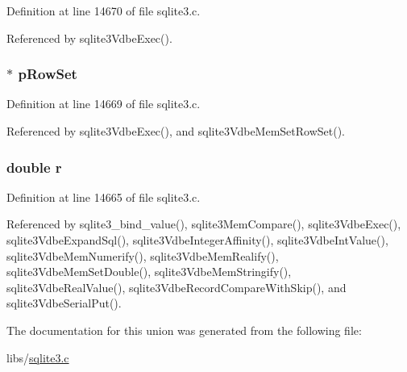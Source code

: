 Definition at line 14670 of file sqlite3.\+c.



Referenced by sqlite3\+Vdbe\+Exec().

\hypertarget{union_mem_1_1_mem_value_abca52c9345f143f58a581345e0afd619}{}
\subsubsection[{p\+Row\+Set}]{$\ast$ p\+Row\+Set}\label{union_mem_1_1_mem_value_abca52c9345f143f58a581345e0afd619}


Definition at line 14669 of file sqlite3.\+c.



Referenced by sqlite3\+Vdbe\+Exec(), and sqlite3\+Vdbe\+Mem\+Set\+Row\+Set().

\hypertarget{union_mem_1_1_mem_value_a880a49112fedae68e714341a9a082fb6}{}
\subsubsection[{r}]{\setlength{\rightskip}{0pt plus 5cm}double r}\label{union_mem_1_1_mem_value_a880a49112fedae68e714341a9a082fb6}


Definition at line 14665 of file sqlite3.\+c.



Referenced by sqlite3\+\_\+bind\+\_\+value(), sqlite3\+Mem\+Compare(), sqlite3\+Vdbe\+Exec(), sqlite3\+Vdbe\+Expand\+Sql(), sqlite3\+Vdbe\+Integer\+Affinity(), sqlite3\+Vdbe\+Int\+Value(), sqlite3\+Vdbe\+Mem\+Numerify(), sqlite3\+Vdbe\+Mem\+Realify(), sqlite3\+Vdbe\+Mem\+Set\+Double(), sqlite3\+Vdbe\+Mem\+Stringify(), sqlite3\+Vdbe\+Real\+Value(), sqlite3\+Vdbe\+Record\+Compare\+With\+Skip(), and sqlite3\+Vdbe\+Serial\+Put().



The documentation for this union was generated from the following file\+:\begin{DoxyCompactItemize}
\item 
libs/\hyperlink{sqlite3_8c}{sqlite3.\+c}\end{DoxyCompactItemize}

